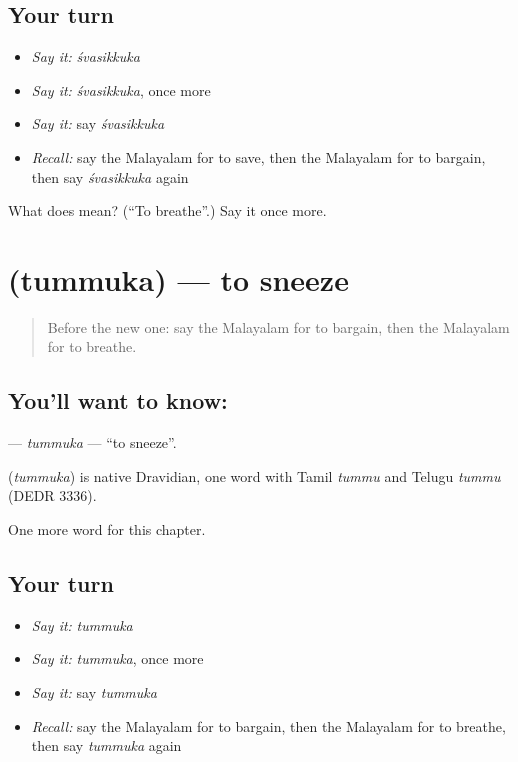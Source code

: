 \subsection*{Your turn}
\begin{itemize}
\raggedright
  \item \emph{Say it:} \emph{śvasikkuka}
  \item \emph{Say it:} \emph{śvasikkuka}, once more
  \item \emph{Say it:} say \emph{śvasikkuka}
  \item \emph{Recall:} say the Malayalam for to save, then the Malayalam for to bargain, then say \emph{śvasikkuka} again
\end{itemize}

\begin{tcolorbox}[breakable,colback=teal!4,colframe=teal!35!black,title={Before you move on}]
What does  mean? (\textquotedblleft{}To breathe\textquotedblright{}.) Say it once more.
\end{tcolorbox}
\section[\texorpdfstring{\ml{തുമ്മുക} (tummuka)}{തുമ്മുക (tummuka)}]{ (tummuka) — to sneeze}

\label{lesson:ML-C304-tummuka}



\begin{quote}
Before the new one: say the Malayalam for to bargain, then the Malayalam for to breathe.
\end{quote}

\subsection*{You'll want to know: }
\textbf{} — \emph{tummuka} — \textquotedblleft{}to sneeze\textquotedblright{}.

\begin{cousinweb}
\textbf{} (\emph{tummuka}) is native Dravidian, one word with Tamil \emph{tummu} and Telugu \emph{tummu} (DEDR 3336).
\end{cousinweb}

\begin{grammarlens}[title={What you've built}]
One more word for this chapter.
\end{grammarlens}

\subsection*{Your turn}
\begin{itemize}
\raggedright
  \item \emph{Say it:} \emph{tummuka}
  \item \emph{Say it:} \emph{tummuka}, once more
  \item \emph{Say it:} say \emph{tummuka}
  \item \emph{Recall:} say the Malayalam for to bargain, then the Malayalam for to breathe, then say \emph{tummuka} again
\end{itemize}

